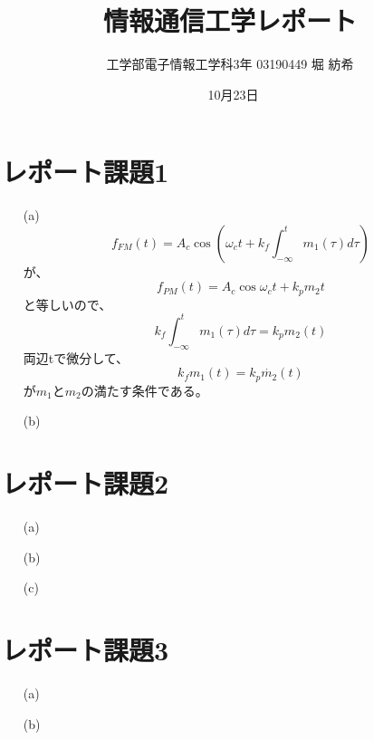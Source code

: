 \documentclass[dvipdfmx]{jsarticle}
\begin{document}
\title{情報通信工学レポート}
\author{工学部電子情報工学科3年 03190449  堀 紡希}
\date{\ 10月23日}
\maketitle

\section*{レポート課題1}

\begin{enumerate}
\item[(a)]
\[f_{FM}(t) = A_{c}\cos{\left(\omega_{c}t+k_{f}\int _{-\infty} ^{t} m_{1}(\tau)d\tau \right)}\]
が、\[f_{PM}(t) = A_{c}\cos{\omega_{c} t+k_{p}m_{2}t}\]
と等しいので、
\[k_{f}\int _{-\infty} ^{t} m_{1}(\tau)d\tau = k_{p}m_{2}(t)\]
両辺tで微分して、
\[k_{f}m_{1}(t) = k_{p}\dot{m_{2}}(t)\]
が$m_{1}$と$m_{2}$の満たす条件である。
\item[(b)]


\end{enumerate}
\section*{レポート課題2}
\begin{enumerate}
\item[(a)]
\item[(b)]
\item[(c)]
\end{enumerate}



\section*{レポート課題3}
\begin{enumerate}
\item[(a)]

\item[(b)]
\end{enumerate}
\end{document}
